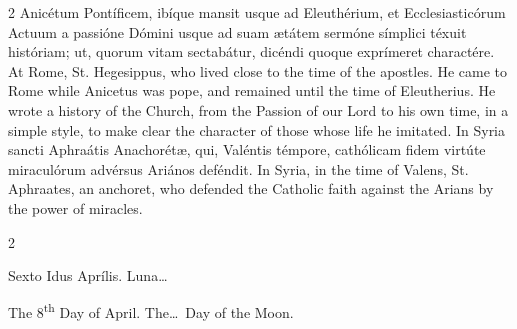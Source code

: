 \begin{paracol}{2}
 Anicétum Pontíficem, ibíque mansit usque ad Eleuthérium, et Ecclesiasticórum 
 Actuum a passióne Dómini usque ad suam ætátem sermóne símplici téxuit 
 históriam; ut, quorum vitam sectabátur, dicéndi quoque exprímeret charactére.
\switchcolumn
{}
At Rome, St. Hegesippus, who lived close to the time of the apostles. 
 He came to Rome while Anicetus was pope, and remained until the time of 
 Eleutherius. He wrote a history of the Church, from the Passion of our 
 Lord to his own time, in a simple style, to make clear the character of 
 those whose life he imitated.
\switchcolumn*
{}
In Syria sancti Aphraátis Anachorétæ, qui, Valéntis témpore, cathólicam 
 fidem virtúte miraculórum advérsus Ariános deféndit.
\switchcolumn
{}
In Syria, in the time of Valens, St. Aphraates, an anchoret, who defended 
 the Catholic faith against the Arians by the power of miracles.
\switchcolumn*
{}
\end{paracol}


\begin{paracol}{2}
\begin{center}{\color{gregoriocolor} Sexto Idus Aprílis. 
 Luna\dots\ }\end{center}
\switchcolumn
{}
\begin{center}{\color{gregoriocolor} The 8\textsuperscript{th} Day of April. The\dots\ Day of the Moon.}\end{center}
\end{paracol}

